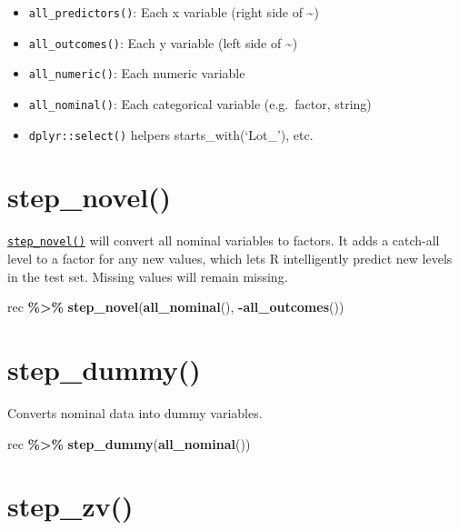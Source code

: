 \documentclass[
]{book}
\newenvironment{Shaded}{\begin{snugshade}}{\end{snugshade}}
\newcommand{\KeywordTok}[1]{\textcolor[rgb]{0.13,0.29,0.53}{\textbf{#1}}}
\newcommand{\NormalTok}[1]{#1}
\newcommand{\OperatorTok}[1]{\textcolor[rgb]{0.81,0.36,0.00}{\textbf{#1}}}
\newcommand{\StringTok}[1]{\textcolor[rgb]{0.31,0.60,0.02}{#1}}
\providecommand{\tightlist}{%
  \setlength{\itemsep}{0pt}\setlength{\parskip}{0pt}}
\begin{document}
\begin{itemize}
\tightlist
\item
  \texttt{all\_predictors()}: Each x variable (right side of \textasciitilde)
\item
  \texttt{all\_outcomes()}: Each y variable (left side of \textasciitilde)
\item
  \texttt{all\_numeric()}: Each numeric variable
\item
  \texttt{all\_nominal()}: Each categorical variable (e.g.~factor, string)
\item
  \texttt{dplyr::select()} helpers starts\_with(`Lot\_'), etc.
\end{itemize}

\hypertarget{step_novel}{%
\section{step\_novel()}\label{step_novel}}

\href{https://recipes.tidymodels.org/reference/step_novel.html}{\texttt{step\_novel()}} will convert all nominal variables to factors. It adds a catch-all level to a factor for any new values, which lets R intelligently predict new levels in the test set. Missing values will remain missing.

\begin{Shaded}
\begin{Highlighting}[]
\NormalTok{rec }\OperatorTok{\%\textgreater{}\%}
\StringTok{  }\KeywordTok{step\_novel}\NormalTok{(}\KeywordTok{all\_nominal}\NormalTok{(), }\OperatorTok{{-}}\KeywordTok{all\_outcomes}\NormalTok{())}
\end{Highlighting}
\end{Shaded}

\hypertarget{step_dummy}{%
\section{step\_dummy()}\label{step_dummy}}

Converts nominal data into dummy variables.

\begin{Shaded}
\begin{Highlighting}[]
\NormalTok{rec }\OperatorTok{\%\textgreater{}\%}
\StringTok{  }\KeywordTok{step\_dummy}\NormalTok{(}\KeywordTok{all\_nominal}\NormalTok{())}
\end{Highlighting}
\end{Shaded}

\hypertarget{step_zv}{%
\section{step\_zv()}\label{step_zv}}
\end{document}

